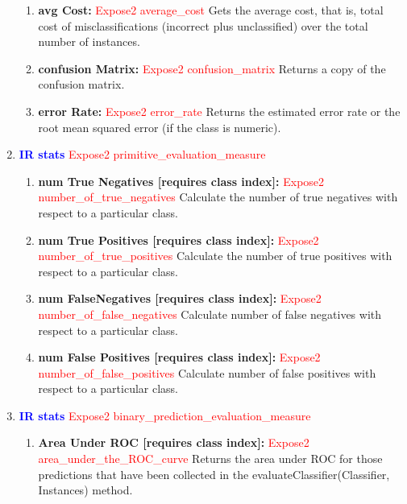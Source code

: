 \documentclass[a4paper,12pt, english]{article}
\begin{document}
\begin{enumerate}
\begin{enumerate}
\item \textbf{avg Cost: } \textcolor{red}{Expose2 average\_cost}
          Gets the average cost, that is, total cost of misclassifications (incorrect plus unclassified) over the total number of instances.               

\item \textbf{confusion Matrix: } \textcolor{red}{Expose2 confusion\_matrix}
          Returns a copy of the confusion matrix.                         
          
\item \textbf{error Rate: } \textcolor{red}{Expose2 error\_rate}
          Returns the estimated error rate or the root mean squared error (if the class is numeric). 

\end{enumerate} 





\item  \textbf{\textcolor{blue}{IR stats}} \textcolor{red}{Expose2 primitive\_evaluation\_measure}
\begin{enumerate}          
          
\item \textbf{num True Negatives [requires class index]: } \textcolor{red}{Expose2 number\_of\_true\_negatives}
          Calculate the number of true negatives with respect to a particular class.
          
\item \textbf{num True Positives [requires class index]: } \textcolor{red}{Expose2 number\_of\_true\_positives}
          Calculate the number of true positives with respect to a particular class. 

\item \textbf{num FalseNegatives [requires class index]: } \textcolor{red}{Expose2 number\_of\_false\_negatives}
          Calculate number of false negatives with respect to a particular class. 
          
\item \textbf{num False Positives [requires class index]: } \textcolor{red}{Expose2 number\_of\_false\_positives}
          Calculate number of false positives with respect to a particular class. 
          
          
\end{enumerate}    

\item  \textbf{\textcolor{blue}{IR stats}} \textcolor{red}{Expose2 binary\_prediction\_evaluation\_measure}
\begin{enumerate}          
\item \textbf{Area Under ROC  [requires class index]: } \textcolor{red}{Expose2 area\_under\_the\_ROC\_curve}
          Returns the area under ROC for those predictions that have been collected in the evaluateClassifier(Classifier, Instances) method.           
          

\end{enumerate}
\end{enumerate}
\end{document}

